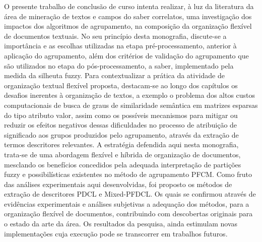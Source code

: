 O presente trabalho de conclusão de curso intenta realizar, à luz da literatura da área de mineração
de textos e campos do saber correlatos, uma investigação dos impactos dos algoritmos de agrupamento,
na composição da organização flexível de documentos textuais. No seu princípio desta monografia,
discute-se a importância e as escolhas utilizadas na etapa pré-processamento, anterior à aplicação
do agrupamento, além dos critérios de validação do agrupamento que são utilizados no etapa do
pós-processamento, a saber, implementado pela medida da silheuta fuzzy. Para contextualizar a
prática da atividade de organização textual flexível proposta, destacam-se ao longo dos capítulos os
desafios inerentes à organização de textos, a exemplo o problema dos altos custos computacionais de
busca de graus de similaridade semântica em matrizes esparsas do tipo atributo valor, assim como os
possíveis mecanismos para mitigar ou reduzir os efeitos negativos dessas dificuldades no processo de
atribuição de significado aos grupos produzidos pelo agrupamento, através da extração de termos
descritores relevantes. A estratégia defendida aqui nesta monografia, trata-se de uma abordagem
flexível e híbrida de organização de documentos, mesclando os benefícios concedidos pela adequada
interpretação de partições fuzzy e possibilísticas existentes no método de agrupamento PFCM. Como
fruto das análises experimentais aqui desenvolvidas, foi proposto os métodos de extração de
descritores PDCL e Mixed-PFDCL. Os quais se confirmou através de evidências experimentais e análises
subjetivas a adequação dos métodos, para a organização flexível de documentos, contribuindo com
descobertas originais para o estado da arte da área. Os resultados da pesquisa, ainda estimulam
novas implementações cuja execução pode se transcorrer em trabalhos futuros.
